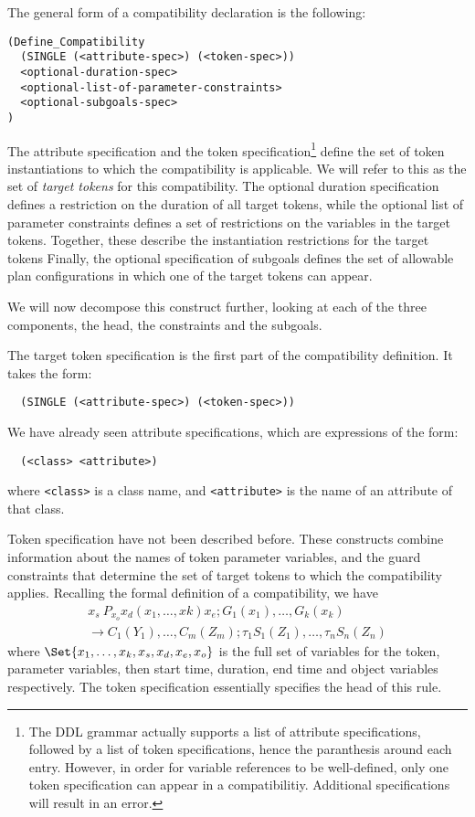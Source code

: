 The general form of a compatibility declaration is the following:
  \begin{verbatim} 
(Define_Compatibility
  (SINGLE (<attribute-spec>) (<token-spec>))
  <optional-duration-spec>
  <optional-list-of-parameter-constraints>
  <optional-subgoals-spec>
)  \end{verbatim}
  The attribute specification and the token specification\footnote{The
DDL grammar actually supports a list of attribute specifications,
followed by a list of token specifications, hence the paranthesis
around each entry.  However, in order for variable references to be
well-defined, only one token specification can appear in a
compatibilitiy.  Additional specifications will result in an error.}
define the set of token instantiations to which the compatibility is
applicable.  We will refer to this as the set of {\em target tokens}
for this compatibility.  The optional duration specification defines a
restriction on the duration of all target tokens, while the optional
list of parameter constraints defines a set of restrictions on the
variables in the target tokens.  Together, these describe the
instantiation restrictions for the target tokens Finally, the optional
specification of subgoals defines the set of allowable plan
configurations in which one of the target tokens can appear.

We will now decompose this construct further, looking at each of the
three components, the head, the constraints and the subgoals.




The target token specification is the first part of the compatibility
definition.  It takes the form:
\begin{verbatim}
  (SINGLE (<attribute-spec>) (<token-spec>))  \end{verbatim}

We have already seen attribute specifications, which are expressions
of the form: 
  \begin{verbatim}
  (<class> <attribute>) \end{verbatim}
  where {\tt <class>} is a class name, and {\tt <attribute>} is the
name of an attribute of that class.

Token specification have not been described before.  These constructs
combine information about the names of token parameter variables, and
the guard constraints that determine the set of target tokens to which
the compatibility applies.  Recalling the formal definition of a
compatibility, we have
  \begin{eqnarray*} 
  x_s \ P_{x_o} x_d (x_1,\ldots,xk) x_e; G_1(x_1), \ldots, G_k(x_k)
\\
  \rightarrow C_1(Y_1), \ldots, C_m(Z_m); \tau_1 S_1(Z_1), \ldots,
\tau_n S_n(Z_n)
  \end{eqnarray*}
  where $\Set{x_1,\ldots,x_k,x_s,x_d,x_e, x_o}$ is the full set of
variables for the token, parameter variables, then start time,
duration, end time and object variables respectively.  The token
specification essentially specifies the head of this rule.

